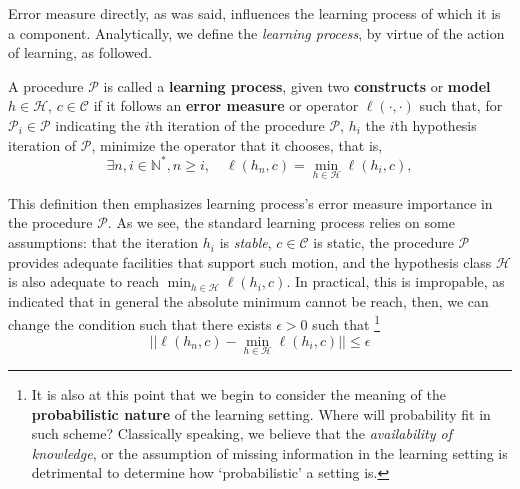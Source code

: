 \documentclass{article}
\begin{document}
Error measure directly, as was said, influences the learning process of which it is a component. Analytically, we define the \textit{learning process}, by virtue of the action of learning, as followed. 
\begin{definition}
  A procedure $\mathcal{P}$ is called a \textbf{learning process}, given two \textbf{constructs} or \textbf{model} $h\in \mathcal{H}$, $c\in \mathcal{C}$ if it follows an \textbf{error measure} or operator $\ell(\cdot, \cdot)$ such that, for $\mathcal{P}_{i}\in \mathcal{P}$ indicating the $i$th iteration of the procedure $\mathcal{P}$, $h_{i}$ the $i$th hypothesis iteration of $\mathcal{P}$, minimize the operator that it chooses, that is,
  \begin{equation}
    \exists n,i\in \mathbb{N}^{*}, n \geq i,  \quad  \ell(h_{n},c) = \min_{h\in \mathcal{H}}\ell(h_{i},c), 
  \end{equation} 
\end{definition}
This definition then emphasizes learning process's error measure importance in the procedure $\mathcal{P}$. As we see, the standard learning process relies on some assumptions: that the iteration $h_{i}$ is \textit{stable}, $c\in \mathcal{C}$ is static, the procedure $\mathcal{P}$ provides adequate facilities that support such motion, and the hypothesis class $\mathcal{H}$ is also adequate to reach $\min_{h\in\mathcal{H}}\ell (h_{i},c)$. In practical, this is impropable, as \cite{10.5555/2371238} indicated that in general the absolute minimum cannot be reach, then, we can change the condition such that there exists $\epsilon > 0$ such that \footnote{It is also at this point that we begin to consider the meaning of the \textbf{probabilistic nature} of the learning setting. Where will probability fit in such scheme? Classically speaking, we believe that the \textit{availability of knowledge}, or the assumption of missing information in the learning setting is detrimental to determine how `probabilistic' a setting is. 
}
\begin{equation}
  \lvert \lvert \ell(h_{n},c) - \min_{h\in \mathcal{H}}\ell(h_{i},c)\rvert \rvert \leq \epsilon
\end{equation}
\end{document}
